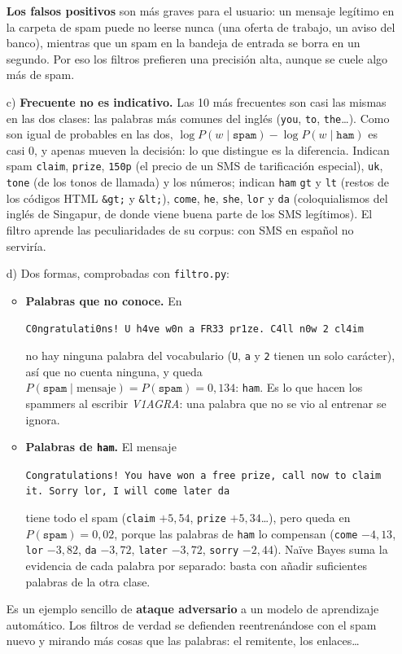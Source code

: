 \documentclass{article}
\begin{document}
\begin{enumerate}
    \textbf{Los falsos positivos} son más graves para el usuario: un mensaje legítimo en la carpeta de spam puede no leerse nunca (una oferta de trabajo, un aviso del banco), mientras que un spam en la bandeja de entrada se borra en un segundo. Por eso los filtros prefieren una precisión alta, aunque se cuele algo más de spam.

    \item[c)] \textbf{Frecuente no es indicativo.} Las 10 más frecuentes son casi las mismas en las dos clases: las palabras más comunes del inglés (\texttt{you}, \texttt{to}, \texttt{the}\dots). Como son igual de probables en las dos, $\log P(w \mid \texttt{spam}) - \log P(w \mid \texttt{ham})$ es casi 0, y apenas mueven la decisión: lo que distingue es la diferencia. Indican spam \texttt{claim}, \texttt{prize}, \texttt{150p} (el precio de un SMS de tarificación especial), \texttt{uk}, \texttt{tone} (de los tonos de llamada) y los números; indican \texttt{ham} \texttt{gt} y \texttt{lt} (restos de los códigos HTML \texttt{\&gt;} y \texttt{\&lt;}), \texttt{come}, \texttt{he}, \texttt{she}, \texttt{lor} y \texttt{da} (coloquialismos del inglés de Singapur, de donde viene buena parte de los SMS legítimos). El filtro aprende las peculiaridades de su corpus: con SMS en español no serviría.

    \item[d)] Dos formas, comprobadas con \texttt{filtro.py}:
    \begin{itemize}
        \item \textbf{Palabras que no conoce.} En
        \begin{flushleft}\small\texttt{C0ngratulati0ns! U h4ve w0n a FR33 pr1ze. C4ll n0w 2 cl4im}\end{flushleft}
        no hay ninguna palabra del vocabulario (\texttt{U}, \texttt{a} y \texttt{2} tienen un solo carácter), así que no cuenta ninguna, y queda $P(\texttt{spam} \mid \text{mensaje}) = P(\texttt{spam}) = 0{,}134$: \texttt{ham}. Es lo que hacen los spammers al escribir \textit{V1AGRA}: una palabra que no se vio al entrenar se ignora.
        \item \textbf{Palabras de \texttt{ham}.} El mensaje
        \begin{flushleft}\small\texttt{Congratulations! You have won a free prize, call now to claim it. Sorry lor, I will come later da}\end{flushleft}
        tiene todo el spam (\texttt{claim} $+5{,}54$, \texttt{prize} $+5{,}34$\dots), pero queda en $P(\texttt{spam}) = 0{,}02$, porque las palabras de \texttt{ham} lo compensan (\texttt{come} $-4{,}13$, \texttt{lor} $-3{,}82$, \texttt{da} $-3{,}72$, \texttt{later} $-3{,}72$, \texttt{sorry} $-2{,}44$). Naïve Bayes suma la evidencia de cada palabra por separado: basta con añadir suficientes palabras de la otra clase.
    \end{itemize}
    Es un ejemplo sencillo de \textbf{ataque adversario} a un modelo de aprendizaje automático. Los filtros de verdad se defienden reentrenándose con el spam nuevo y mirando más cosas que las palabras: el remitente, los enlaces\dots
\end{enumerate}
\end{document}
